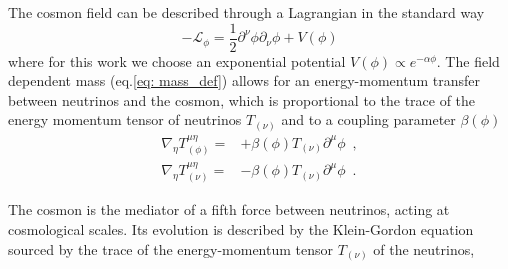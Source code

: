 The cosmon field can be described through a Lagrangian in the standard
way 
\begin{equation}
-\mathcal{L_{\phi}}=\frac{1}{2}\partial^{\nu}\phi\partial_{\nu}\phi+V(\phi)
\end{equation}
where for this work we choose an exponential potential $V(\phi)\propto e^{-\alpha\phi}$.
The field dependent mass (eq.\ref{eq: mass_def}) allows for
an energy-momentum transfer between neutrinos and the cosmon, which
is proportional to the trace of the energy momentum tensor of neutrinos
$T_{(\nu)}$ and to a coupling parameter $\beta(\phi)$ 
\begin{align}
\nabla_{\eta}T_{(\phi)}^{\mu\eta}= & +\beta(\phi)T_{(\nu)}\partial^{\mu}\phi\,\,\,,\label{eq:continuity-phi}\\
\nabla_{\eta}T_{(\nu)}^{\mu\eta}= & -\beta(\phi)T_{(\nu)}\partial^{\mu}\phi\,\,\,.\label{eq:continuity-nu}
\end{align}


The cosmon is the mediator of a fifth force between neutrinos, acting
at cosmological scales. Its evolution is described by the Klein-Gordon
equation sourced by the trace of the energy-momentum tensor $T_{(\nu)}$
of the neutrinos,

